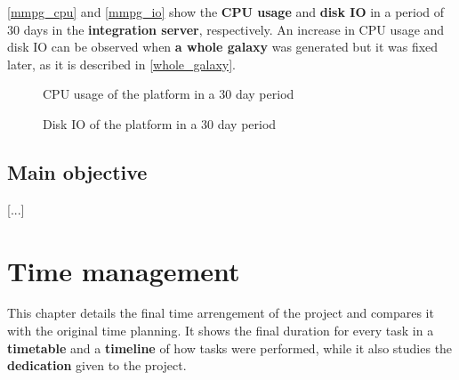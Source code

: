 \documentclass[a4paper,11pt,titlepage,abstract,numbers=noenddot,automark,mnsy,intlimits,rgb,dvipsnames]{report}
\begin{document}
\autoref{mmpg_cpu} and \autoref{mmpg_io} show the \textbf{CPU usage} and \textbf{disk IO} in a period of 30 days in
the \textbf{integration server}, respectively. An increase in CPU usage and disk IO
can be observed when \textbf{a whole galaxy} was generated but it was fixed later, as it is described in \autoref{whole_galaxy}.
\begin{figure}[H]
\noindent{}
\caption{CPU usage of the platform in a 30 day period}
\label{mmpg_cpu}
\end{figure}
\begin{figure}[H]
\noindent{}
\caption{Disk IO of the platform in a 30 day period}
\label{mmpg_io}
\end{figure}
\section{Main objective}
[...]
\chapter{Time management}
This chapter details the final time arrengement of the project and compares it with the original time planning.
It shows the final duration for every task in a \textbf{timetable} and a \textbf{timeline} of how tasks were performed, while it
also studies the \textbf{dedication} given to the project.
\end{document}
